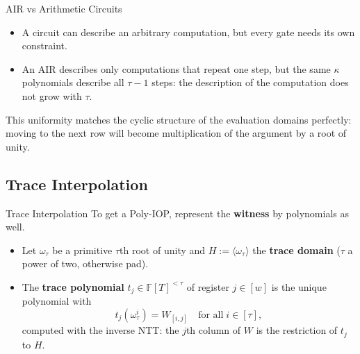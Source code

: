\documentclass{zkdl-presentation-template}
\begin{document}
    \begin{frame}{AIR vs Arithmetic Circuits}
        \begin{itemize}
            \item A circuit can describe an arbitrary computation, but every gate needs its own constraint.\pause
            \item An AIR describes only computations that repeat one step, but the same $\kappa$ polynomials describe all $\tau - 1$ steps: the description of the computation does not grow with $\tau$.
        \end{itemize}
        \pause

        \begin{remark}
            This uniformity matches the cyclic structure of the evaluation domains perfectly: moving to the next row will become multiplication of the argument by a root of unity.
        \end{remark}
    \end{frame}

    \subsection{Trace Interpolation}

    \begin{frame}{Trace Interpolation}
        To get a Poly-IOP, represent the \textbf{witness} by polynomials as well.
        \begin{itemize}
            \item<2-> Let $\omega_\tau$ be a primitive $\tau$th root of unity and $H := \langle \omega_\tau \rangle$ the \textbf{trace domain} ($\tau$ a power of two, otherwise pad).
            \item<3-> The \textbf{trace polynomial} $t_j \in \mathbb{F}[T]^{<\tau}$ of register $j \in [w]$ is the unique polynomial with
            \begin{equation*}
                t_j(\omega_\tau^i) = W_{[i,j]} \quad \text{for all} \; i \in [\tau],
            \end{equation*}
            computed with the inverse NTT: the $j$th column of $W$ is the restriction of $t_j$ to $H$.
        \end{itemize}
    \end{frame}
\end{document}
